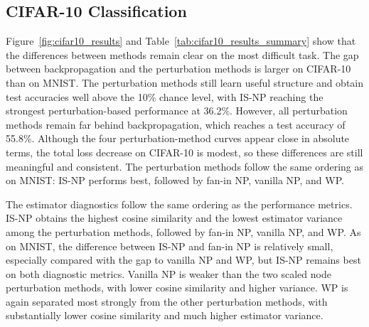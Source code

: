 \FloatBarrier

\subsection{CIFAR-10 Classification}

Figure~\ref{fig:cifar10_results} and Table~\ref{tab:cifar10_results_summary} show that the differences between methods remain clear on the most difficult task. The gap between backpropagation and the perturbation methods is larger on CIFAR-10 than on MNIST. The perturbation methods still learn useful structure and obtain test accuracies well above the 10\% chance level, with IS-NP reaching the strongest perturbation-based performance at 36.2\%. However, all perturbation methods remain far behind backpropagation, which reaches a test accuracy of 55.8\%. Although the four perturbation-method curves appear close in absolute terms, the total loss decrease on CIFAR-10 is modest, so these differences are still meaningful and consistent. The perturbation methods follow the same ordering as on MNIST: IS-NP performs best, followed by fan-in NP, vanilla NP, and WP.

The estimator diagnostics follow the same ordering as the performance metrics. IS-NP obtains the highest cosine similarity and the lowest estimator variance among the perturbation methods, followed by fan-in NP, vanilla NP, and WP. As on MNIST, the difference between IS-NP and fan-in NP is relatively small, especially compared with the gap to vanilla NP and WP, but IS-NP remains best on both diagnostic metrics. Vanilla NP is weaker than the two scaled node perturbation methods, with lower cosine similarity and higher variance. WP is again separated most strongly from the other perturbation methods, with substantially lower cosine similarity and much higher estimator variance.

